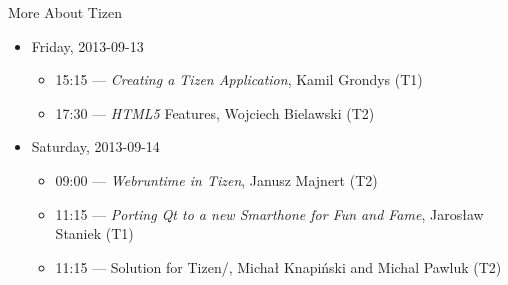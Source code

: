 \documentclass[presentation,aspectratio=43,12pt]{beamer}
\begin{document}
\begin{frame}[label=sec-5-2]{More About Tizen}
\begin{itemize}
\item Friday, 2013-09-13
\begin{itemize}
\item 15:15 — \emph{Creating a Tizen Application}, Kamil Grondys (T1)
\item 17:30 — \emph{HTML5} Features, Wojciech Bielawski (T2)
\end{itemize}
\item Saturday, 2013-09-14
\begin{itemize}
\item 09:00 — \emph{Webruntime in Tizen}, Janusz Majnert (T2)
\item 11:15 — \emph{Porting Qt to a new Smarthone for Fun and Fame},
Jarosław Staniek (T1)
\item 11:15 — Solution for Tizen/, Michał Knapiński
and Michal Pawluk (T2)
\end{itemize}
\end{itemize}
\end{frame}
\end{document}
